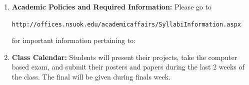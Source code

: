 \documentclass{article}
\begin{document}
\begin{enumerate}
\item \textbf{Academic Policies and Required Information:} Please go to 

\begin{center}
\texttt{http://offices.nsuok.edu/academicaffairs/SyllabiInformation.aspx}
\end{center}

for important information pertaining to:



\item \textbf{Class Calendar:} Students will present their projects, take the computer based exam, and submit their posters and papers during the last 2 weeks of the class. The final will be given during finals week.
\end{enumerate}
\end{document}
